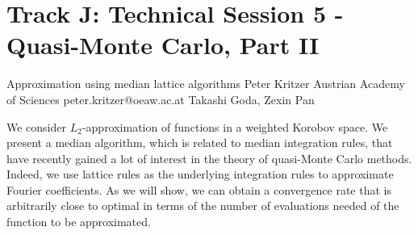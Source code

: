 \section{Track J: Technical Session 5 - Quasi-Monte Carlo, Part II}\newpage

\begin{talk}
  {Approximation using median lattice algorithms}%
  {Peter Kritzer}%
  {Austrian Academy of Sciences}%
  {peter.kritzer@oeaw.ac.at}%
  {Takashi Goda, Zexin Pan}%
  
    
   
We consider $L_2$-approximation of functions in a weighted Korobov space. We present a median algorithm, which is related to median integration rules, that have recently gained a lot of interest in the theory of quasi-Monte Carlo methods. Indeed, we use lattice rules as the underlying integration rules to approximate Fourier coefficients. As we will show, we can obtain a convergence rate that is arbitrarily close to optimal in terms of the number of evaluations needed of the function to be approximated.
\end{talk}

